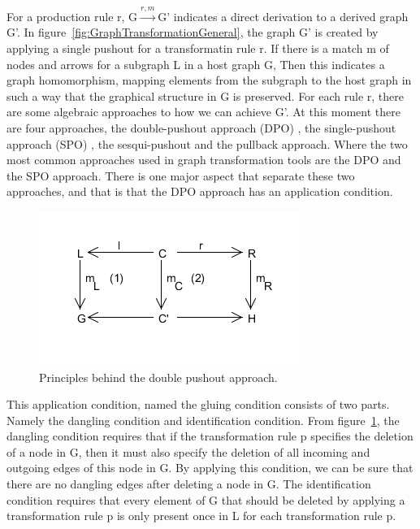 For a production rule r, \mbox{G$\xrightarrow{r,m}$G'} indicates a direct
derivation to a derived graph G'. In
figure~\ref{fig:GraphTransformationGeneral}, the graph G' is created by
applying a single pushout for a transformatin rule r. If there is a match m of
nodes and arrows for a subgraph L in a host graph G, Then this indicates a
graph homomorphism, mapping elements from the subgraph to the host graph in
such a way that the graphical structure in G is preserved. For each rule r,
there are some algebraic approaches to how we can achieve G'. At this moment
there are four approaches, the double-pushout approach (DPO) \cite{Loewe1997}, the
single-pushout approach (SPO) \cite{Ehrig1997}, the
sesqui-pushout\cite{Corradini2006} and the pullback approach\cite{Bauderon}.
Where the two most common approaches used in graph transformation tools are the
DPO and the SPO approach. There is one major aspect that separate these two
approaches, and that is that the DPO approach has an application condition.

\begin{figure}[H]
	\centering
	\includegraphics[scale=0.7]{./Figures/Double_Pushout.png}
	\caption[The Double Pushout approach]
	{Principles behind the double pushout approach.}
	\label{fig:DPO}
\end{figure}

\noindent This application condition, named the gluing condition\cite{Loewe1997}
consists of two parts. Namely the dangling condition and identification
condition. From figure~\ref{fig:DPO}, the dangling condition requires that if
the transformation rule p specifies the deletion of a node in G, then it must also
specify the deletion of all incoming and outgoing edges of this node in G. By
applying this condition, we can be sure that there are no dangling edges after
deleting a node in G. The identification condition requires that every element
of G that should be deleted by applying a transformation rule p is only present
once in L for each transformation rule p. 

